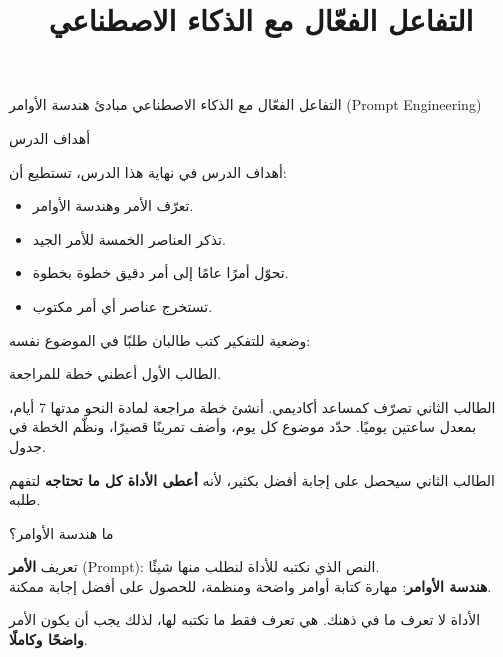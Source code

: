 \documentclass[aspectratio=169, 11pt, xcolor={table}]{beamer}
\title{التفاعل الفعّال مع الذكاء الاصطناعي}
\begin{document}
{التفاعل الفعّال مع الذكاء الاصطناعي}
{مبادئ هندسة الأوامر \textenglish{(Prompt Engineering)}}

\begin{frame}{أهداف الدرس}
    \begin{tbox}{\faBullseye\quad أهداف الدرس}
        في نهاية هذا الدرس، تستطيع أن:
        \begin{itemize}
            \item تعرّف الأمر وهندسة الأوامر.
            \item تذكر العناصر الخمسة للأمر الجيد.
            \item تحوّل أمرًا عامًا إلى أمر دقيق خطوة بخطوة.
            \item تستخرج عناصر أي أمر مكتوب.
        \end{itemize}
    \end{tbox}
\end{frame}

\begin{frame}{وضعية للتفكير}
    \small
    كتب طالبان طلبًا في الموضوع نفسه:
    \begin{obox}{\faTimesCircle\quad الطالب الأول}
        أعطني خطة للمراجعة.
    \end{obox}
    \begin{tbox}{\faCheckCircle\quad الطالب الثاني}
        تصرّف كمساعد أكاديمي. أنشئ خطة مراجعة لمادة النحو مدتها 7 أيام،
        بمعدل ساعتين يوميًا. حدّد موضوع كل يوم، وأضف تمرينًا قصيرًا، ونظّم الخطة في جدول.
    \end{tbox}
    الطالب الثاني سيحصل على إجابة أفضل بكثير، لأنه \textbf{أعطى الأداة كل ما تحتاجه} لتفهم طلبه.
\end{frame}

\begin{frame}{ما هندسة الأوامر؟}
    \begin{tbox}{\faLightbulb\quad تعريف}
        \textbf{الأمر} \textenglish{(Prompt)}: النص الذي نكتبه للأداة لنطلب منها شيئًا.\\[3pt]
        \textbf{هندسة الأوامر}: مهارة كتابة أوامر واضحة ومنظمة،
        للحصول على أفضل إجابة ممكنة.
    \end{tbox}
    الأداة لا تعرف ما في ذهنك. هي تعرف فقط ما تكتبه لها،
    لذلك يجب أن يكون الأمر \textbf{واضحًا وكاملًا}.
\end{frame}
\end{document}
